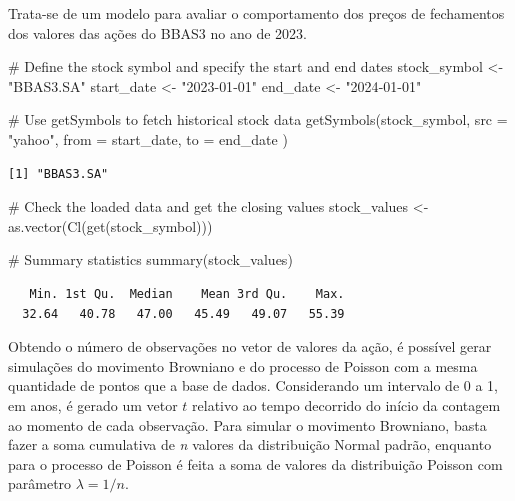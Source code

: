 \documentclass[
  letterpaper,
  DIV=11,
  numbers=noendperiod]{scrreprt}
\newenvironment{Shaded}{\begin{snugshade}}{\end{snugshade}}
\newcommand{\AttributeTok}[1]{\textcolor[rgb]{0.40,0.45,0.13}{#1}}
\newcommand{\CommentTok}[1]{\textcolor[rgb]{0.37,0.37,0.37}{#1}}
\newcommand{\FunctionTok}[1]{\textcolor[rgb]{0.28,0.35,0.67}{#1}}
\newcommand{\NormalTok}[1]{\textcolor[rgb]{0.00,0.23,0.31}{#1}}
\newcommand{\OtherTok}[1]{\textcolor[rgb]{0.00,0.23,0.31}{#1}}
\newcommand{\StringTok}[1]{\textcolor[rgb]{0.13,0.47,0.30}{#1}}
\begin{document}

Trata-se de um modelo para avaliar o comportamento dos preços de
fechamentos dos valores das ações do BBAS3 no ano de 2023.

\begin{Shaded}
\begin{Highlighting}[]
\CommentTok{\# Define the stock symbol and specify the start and end dates}
\NormalTok{stock\_symbol }\OtherTok{\textless{}{-}} \StringTok{"BBAS3.SA"}
\NormalTok{start\_date }\OtherTok{\textless{}{-}} \StringTok{"2023{-}01{-}01"}
\NormalTok{end\_date }\OtherTok{\textless{}{-}} \StringTok{"2024{-}01{-}01"}

\CommentTok{\# Use getSymbols to fetch historical stock data}
\FunctionTok{getSymbols}\NormalTok{(stock\_symbol,}
    \AttributeTok{src =} \StringTok{"yahoo"}\NormalTok{,}
    \AttributeTok{from =}\NormalTok{ start\_date,}
    \AttributeTok{to =}\NormalTok{ end\_date}
\NormalTok{)}
\end{Highlighting}
\end{Shaded}

\begin{verbatim}
[1] "BBAS3.SA"
\end{verbatim}

\begin{Shaded}
\begin{Highlighting}[]
\CommentTok{\# Check the loaded data and get the closing values}
\NormalTok{stock\_values }\OtherTok{\textless{}{-}} \FunctionTok{as.vector}\NormalTok{(}\FunctionTok{Cl}\NormalTok{(}\FunctionTok{get}\NormalTok{(stock\_symbol)))}

\CommentTok{\# Summary statistics}
\FunctionTok{summary}\NormalTok{(stock\_values)}
\end{Highlighting}
\end{Shaded}

\begin{verbatim}
   Min. 1st Qu.  Median    Mean 3rd Qu.    Max. 
  32.64   40.78   47.00   45.49   49.07   55.39 
\end{verbatim}

Obtendo o número de observações no vetor de valores da ação, é possível
gerar simulações do movimento Browniano e do processo de Poisson com a
mesma quantidade de pontos que a base de dados. Considerando um
intervalo de 0 a 1, em anos, é gerado um vetor \(t\) relativo ao tempo
decorrido do início da contagem ao momento de cada observação. Para
simular o movimento Browniano, basta fazer a soma cumulativa de \emph{n}
valores da distribuição Normal padrão, enquanto para o processo de
Poisson é feita a soma de valores da distribuição Poisson com parâmetro
\(\lambda=1/n\).
\end{document}

